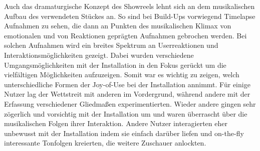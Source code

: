 Auch das dramaturgische Konzept des Showreels lehnt sich an dem musikalischen Aufbau des verwendeten Stückes an. So sind bei Build-Ups vorwiegend Timelapse Aufnahmen zu sehen, die dann an Punkten des musikalischen Klimax von emotionalen und von Reaktionen geprägten Aufnahmen gebrochen werden. Bei solchen Aufnahmen wird ein breites Spektrum an Userreaktionen und Interaktionsmöglichkeiten gezeigt. Dabei wurden verschiedene Umgangsmöglichkeiten mit der Installation in den Fokus gerückt um die vielfältigen Möglichkeiten aufzuzeigen. Somit war es wichtig zu zeigen, welch unterschiedliche Formen der Joy-of-Use bei der Installation annimmt. Für einige Nutzer lag der Wettstreit mit anderen im Vordergrund, während andere mit der Erfassung verschiedener Gliedmaßen experimentierten. Wieder andere gingen sehr zögerlich und vorsichtig mit der Installation um und waren überrascht über die musikalischen Folgen ihrer Interaktion. Andere Nutzer interagierten eher unbewusst mit der Installation indem sie einfach darüber liefen und on-the-fly interessante Tonfolgen kreierten, die weitere Zuschauer anlockten.